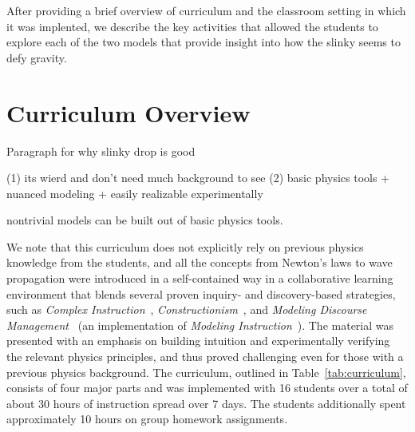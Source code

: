 \documentclass[pre,preprint,superscriptaddress,longbibliography]{revtex4-1}
\begin{document}
After providing a brief overview of curriculum and the classroom setting in which it was implented, we describe the key activities that allowed the students to explore each of the two models that provide insight into how the slinky seems to defy gravity.   

\section{Curriculum Overview}

 

Paragraph for why slinky drop is good

(1) its wierd and don't need much background to see
(2) basic physics tools + nuanced modeling + easily realizable experimentally

nontrivial models can be built out of basic physics tools.


We note that this curriculum does not explicitly rely on previous physics knowledge from the students, and all the concepts from Newton's laws to wave propagation were introduced in a self-contained way in a collaborative learning environment that blends several proven inquiry- and discovery-based strategies, such as \emph{Complex Instruction}~\cite{Cohen1997}, \emph{Constructionism}~\cite{Papert1991}, and \emph{Modeling Discourse Management}~\cite{Desbien2002} (an implementation of \emph{Modeling Instruction}~\cite{Brewe2008}).   The material was presented with an emphasis on building intuition and experimentally verifying the relevant physics principles, and thus proved challenging even for those with a previous physics background.  The curriculum, outlined in Table~\ref{tab:curriculum}, consists of four major parts and was implemented with 16 students over a total of about 30 hours of instruction spread over 7 days. The students additionally spent approximately 10 hours on group homework assignments. 
\end{document}
